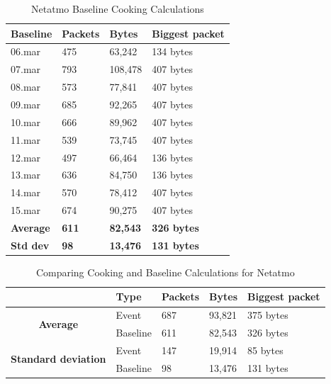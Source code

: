 \begin{table}[!ht]
    \centering
    \caption{Netatmo Baseline Cooking Calculations}
    \begin{tabular}{|l|l|l|l|}
    \hline
        \textbf{Baseline} & \textbf{Packets} & \textbf{Bytes} & \textbf{Biggest packet} \\ \hline
        06.mar & 475 & 63,242 & 134 bytes\\ \hline
        07.mar & 793 & 108,478 & 407 bytes\\ \hline
        08.mar & 573 & 77,841 & 407 bytes \\ \hline
        09.mar & 685 & 92,265 & 407 bytes \\ \hline
        10.mar & 666 & 89,962 & 407 bytes \\ \hline
        11.mar & 539 & 73,745 & 407 bytes \\ \hline
        12.mar & 497 & 66,464 & 136 bytes \\ \hline
        13.mar & 636 & 84,750 & 136 bytes \\ \hline
        14.mar & 570 & 78,412 & 407 bytes \\ \hline
        15.mar & 674 & 90,275 & 407 bytes \\ \hline
        \textbf{Average} &  \textbf{611}  &  \textbf{82,543}  &  \textbf{326 bytes} \\ \hline
        \textbf{Std dev}  &  \textbf{98}   &  \textbf{13,476}   &  \textbf{131 bytes} \\ \hline
    \end{tabular}
    \label{tab:NetatmoBaselineCookingCalculations}
\end{table}

\begin{table}[H]
    \centering
    \caption{Comparing Cooking and Baseline Calculations for Netatmo}
    \begin{tabular}{c|l|l|l|l|}
        \cline{2-5}
        \multicolumn{1}{l|}{}                                              & \textbf{Type} & \textbf{Packets} & \textbf{Bytes} & \textbf{Biggest packet} \\ \hline
        \multicolumn{1}{|c|}{\multirow{2}{*}{\textbf{Average}}}            & Event         & 687              & 93,821         & 375 bytes               \\ \cline{2-5} 
        \multicolumn{1}{|c|}{}                                             & Baseline      & 611              & 82,543         & 326 bytes                \\ \hline
        \multicolumn{1}{|c|}{\multirow{2}{*}{\textbf{Standard deviation}}} & Event         & 147              & 19,914         & 85 bytes                 \\ \cline{2-5} 
        \multicolumn{1}{|c|}{}                                             & Baseline      & 98               & 13,476         & 131 bytes               \\ \hline          
    \end{tabular}
    \label{tab:NetatmoComparingBaselineAndCookingCalculations}
\end{table}

